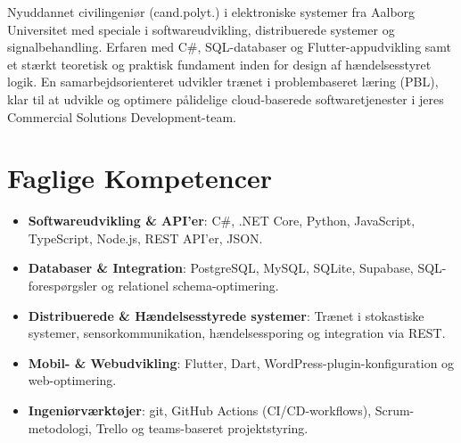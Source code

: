 \documentclass[11pt,a4paper,sans]{moderncv}
\begin{document}
\makecvtitle


\vspace{6pt}
\small{Nyuddannet civilingeniør (cand.polyt.) i elektroniske systemer fra Aalborg Universitet med speciale i softwareudvikling, distribuerede systemer og signalbehandling. Erfaren med C\#, SQL-databaser og Flutter-appudvikling samt et stærkt teoretisk og praktisk fundament inden for design af hændelsesstyret logik. En samarbejdsorienteret udvikler trænet i problembaseret læring (PBL), klar til at udvikle og optimere pålidelige cloud-baserede softwaretjenester i jeres Commercial Solutions Development-team.}


\section{Faglige Kompetencer}
\vspace{1pt}
\begin{itemize}

\item \textbf{Softwareudvikling \& API'er}: C\#, .NET Core, Python, JavaScript, TypeScript, Node.js, REST API'er, JSON.

\item \textbf{Databaser \& Integration}: PostgreSQL, MySQL, SQLite, Supabase, SQL-forespørgsler og relationel schema-optimering.

\item \textbf{Distribuerede \& Hændelsesstyrede systemer}: Trænet i stokastiske systemer, sensorkommunikation, hændelsessporing og integration via REST.

\item \textbf{Mobil- \& Webudvikling}: Flutter, Dart, WordPress-plugin-konfiguration og web-optimering.

\item \textbf{Ingeniørværktøjer}: git, GitHub Actions (CI/CD-workflows), Scrum-metodologi, Trello og teams-baseret projektstyring.

\end{itemize}

\end{document}
